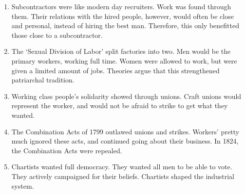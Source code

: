 \documentclass[12pt]{article}
\begin{document}
\begin{enumerate}
\item Subcontractors were like modern day recruiters. Work was found through them. Their relations with the hired people, however, would often be close and personal, instead of hiring the best man. Therefore, this only benefitted those close to a subcontractor.

\item The `Sexual Division of Labor' split factories into two. Men would be the primary workers, working full time. Women were allowed to work, but were given a limited amount of jobs. Theories argue that this strengthened patriarchal tradition.

\item Working class people's solidarity showed through unions. Craft unions would represent the worker, and would not be afraid to strike to get what they wanted.

\item The Combination Acts of 1799 outlawed unions and strikes. Workers' pretty much ignored these acts, and continued going about their business. In 1824, the Combination Acts were repealed.

\item Chartists wanted full democracy. They wanted all men to be able to vote. They actively campaigned for their beliefs. Chartists shaped the industrial system.

\end{enumerate}
\end{document}
